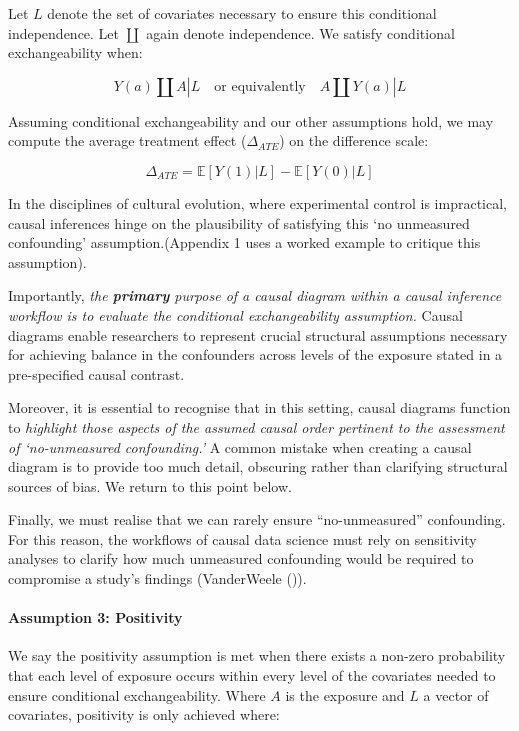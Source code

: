 \documentclass[
  singlecolumn,
  9pt]{article}
\let\oldparagraph\paragraph
\renewcommand{\paragraph}[1]{\oldparagraph{#1}\mbox{}}
\begin{document}
Let \(L\) denote the set of covariates necessary to ensure this
conditional independence. Let \(\coprod\) again denote independence. We
satisfy conditional exchangeability when:

\[
Y(a) \coprod A | L \quad \text{or equivalently} \quad A \coprod Y(a) | L
\]

Assuming conditional exchangeability and our other assumptions hold, we
may compute the average treatment effect (\(\Delta_{ATE}\)) on the
difference scale:

\[
\Delta_{ATE} = \mathbb{E}[Y(1) | L] - \mathbb{E}[Y(0) | L]
\]

In the disciplines of cultural evolution, where experimental control is
impractical, causal inferences hinge on the plausibility of satisfying
this `no unmeasured confounding' assumption.(Appendix 1 uses a worked
example to critique this assumption).

Importantly, \emph{the \textbf{primary} purpose of a causal diagram
within a causal inference workflow is to evaluate the conditional
exchangeability assumption.} Causal diagrams enable researchers to
represent crucial structural assumptions necessary for achieving balance
in the confounders across levels of the exposure stated in a
pre-specified causal contrast.

Moreover, it is essential to recognise that in this setting, causal
diagrams function to \emph{highlight those aspects of the assumed causal
order pertinent to the assessment of `no-unmeasured confounding.'} A
common mistake when creating a causal diagram is to provide too much
detail, obscuring rather than clarifying structural sources of bias. We
return to this point below.

Finally, we must realise that we can rarely ensure ``no-unmeasured''
confounding. For this reason, the workflows of causal data science must
rely on sensitivity analyses to clarify how much unmeasured confounding
would be required to compromise a study's findings (VanderWeele
()).

\paragraph{Assumption 3: Positivity}\label{assumption-3-positivity}

We say the positivity assumption is met when there exists a non-zero
probability that each level of exposure occurs within every level of the
covariates needed to ensure conditional exchangeability. Where \(A\) is
the exposure and \(L\) a vector of covariates, positivity is only
achieved where:
\end{document}
